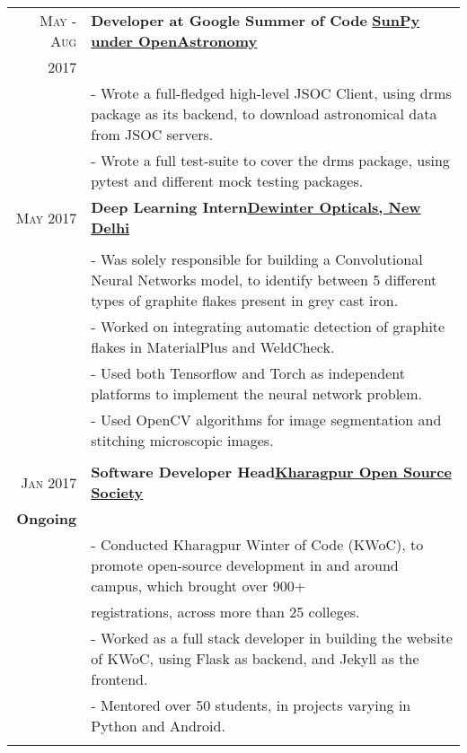 \documentclass[a4paper,10pt]{extarticle} %
\begin{document}
\begin{tabular}{r|p{18cm}}

\textsc{May - Aug} & \textbf{Developer at Google Summer of Code} \textsc\hfill\textbf{\href{http://sunpy.org/}{SunPy under OpenAstronomy}}\\
\textsc{2017}\\
& \footnotesize{- Wrote a full-fledged high-level JSOC Client, using drms package as its backend, to download astronomical data from JSOC servers.}\\
& \footnotesize{- Wrote a full test-suite to cover the drms package, using pytest and different mock testing packages. }
\multicolumn{2}{c}{} \\
\textsc{May 2017} & \textbf{Deep Learning Intern}\hfill\textbf{\href{http://www.dewinterindia.com/}{Dewinter Opticals, New Delhi}}\\
\\
& \footnotesize{- Was solely responsible for building a Convolutional Neural Networks model, to identify between 5 different types of graphite flakes present in grey cast iron. }\\
& \footnotesize{- Worked on integrating automatic detection of graphite flakes in MaterialPlus and WeldCheck.}\\
& \footnotesize{- Used both Tensorflow and Torch as independent platforms to implement the neural network problem.
}\\
& \footnotesize{- Used OpenCV algorithms for image segmentation and stitching microscopic images.
}\\
\multicolumn{2}{c}{} \\

\textsc{Jan 2017} & \textbf{Software Developer Head}\hfill\textbf{\href{http://kossiitkgp.in/}{Kharagpur Open Source Society}}\\
\textbf{Ongoing}\\
& \footnotesize{- Conducted Kharagpur Winter of Code (KWoC), to promote open-source development in and around campus, which brought over 900+}\\
& \footnotesize{registrations, across more than 25 colleges.
}\\
& \footnotesize{- Worked as a full stack developer in building the website of KWoC, using Flask as backend, and Jekyll as the frontend.}\\
& \footnotesize{- Mentored over 50 students, in projects varying in Python and Android.}\\
\multicolumn{2}{c}{} \\

\end{tabular}
\end{document}
